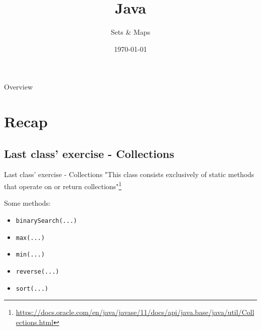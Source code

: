


\title{Java}
\subtitle{Sets & Maps}
\date{\today}


	
	\begin{frame}
		\titlepage
	\end{frame}
	
	\begin{frame}{Overview}
		\tableofcontents
	\end{frame}
	
	\section{Recap}
	\subsection{Last class' exercise - Collections}
	\begin{frame}{Last class' exercise - Collections}
		"This class consists exclusively of static methods that operate on or return collections"\footnote{\url{https://docs.oracle.com/en/java/javase/11/docs/api/java.base/java/util/Collections.html}}
		
		Some methods:
		\begin{itemize}
			\item \texttt{binarySearch(...)}
			\item \texttt{max(...)}
			\item \texttt{min(...)}
			\item \texttt{reverse(...)}
			\item \texttt{sort(...)}
		\end{itemize}
	\end{frame}
